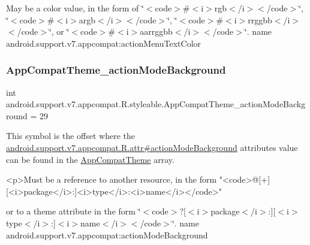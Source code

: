 May be a color value, in the form of \char`\"{}$<$code$>$\#$<$i$>$rgb$<$/i$>$$<$/code$>$\char`\"{}, \char`\"{}$<$code$>$\#$<$i$>$argb$<$/i$>$$<$/code$>$\char`\"{}, \char`\"{}$<$code$>$\#$<$i$>$rrggbb$<$/i$>$$<$/code$>$\char`\"{}, or \char`\"{}$<$code$>$\#$<$i$>$aarrggbb$<$/i$>$$<$/code$>$\char`\"{}.  name android.\+support.\+v7.\+appcompat\+:action\+Menu\+Text\+Color \mbox{\label{classandroid_1_1support_1_1v7_1_1appcompat_1_1R_1_1styleable_ab3232a346cf79317002a4865cfc6b8bc}} 
\subsubsection{\texorpdfstring{App\+Compat\+Theme\+\_\+action\+Mode\+Background}{AppCompatTheme\_actionModeBackground}}
{\footnotesize\ttfamily int android.\+support.\+v7.\+appcompat.\+R.\+styleable.\+App\+Compat\+Theme\+\_\+action\+Mode\+Background = 29\hspace{0.3cm}{\ttfamily [static]}}

This symbol is the offset where the \hyperlink{classandroid_1_1support_1_1v7_1_1appcompat_1_1R_1_1attr_ae72385f347b4f74aea4d77340a4ab5a4}{android.\+support.\+v7.\+appcompat.\+R.\+attr\#action\+Mode\+Background} attribute\textquotesingle{}s value can be found in the \hyperlink{classandroid_1_1support_1_1v7_1_1appcompat_1_1R_1_1styleable_a5c42f89e8a410c323be34208d75c430b}{App\+Compat\+Theme} array.

\begin{DoxyVerb}      <p>Must be a reference to another resource, in the form "<code>@[+][<i>package</i>:]<i>type</i>:<i>name</i></code>"
\end{DoxyVerb}
 or to a theme attribute in the form \char`\"{}$<$code$>$?\mbox{[}$<$i$>$package$<$/i$>$\+:\mbox{]}\mbox{[}$<$i$>$type$<$/i$>$\+:\mbox{]}$<$i$>$name$<$/i$>$$<$/code$>$\char`\"{}.  name android.\+support.\+v7.\+appcompat\+:action\+Mode\+Background \mbox{\label{classandroid_1_1support_1_1v7_1_1appcompat_1_1R_1_1styleable_a75da0b6bb36190916e35341ab687f5f2}} 
